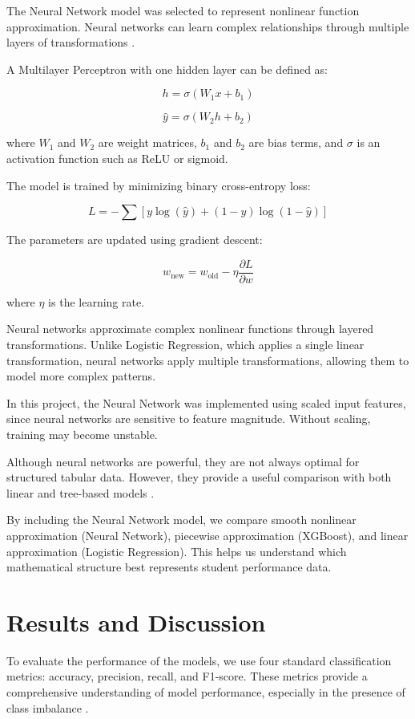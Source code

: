 \documentclass[conference]{IEEEtran}
\begin{document}
The Neural Network model was selected to represent nonlinear function approximation. Neural networks can learn complex relationships through multiple layers of transformations \cite{chong2025}.

A Multilayer Perceptron with one hidden layer can be defined as:

\[
h = \sigma(W_1 x + b_1)
\]

\[
\hat{y} = \sigma(W_2 h + b_2)
\]

where $W_1$ and $W_2$ are weight matrices, $b_1$ and $b_2$ are bias terms, and $\sigma$ is an activation function such as ReLU or sigmoid.

The model is trained by minimizing binary cross-entropy loss:

\[
L = - \sum \left[ y \log(\hat{y}) + (1 - y) \log(1 - \hat{y}) \right]
\]

The parameters are updated using gradient descent:

\[
w_{\text{new}} = w_{\text{old}} - \eta \frac{\partial L}{\partial w}
\]

where $\eta$ is the learning rate.

Neural networks approximate complex nonlinear functions through layered transformations. Unlike Logistic Regression, which applies a single linear transformation, neural networks apply multiple transformations, allowing them to model more complex patterns.

In this project, the Neural Network was implemented using scaled input features, since neural networks are sensitive to feature magnitude. Without scaling, training may become unstable.

Although neural networks are powerful, they are not always optimal for structured tabular data. However, they provide a useful comparison with both linear and tree-based models \cite{chong2025}.

By including the Neural Network model, we compare smooth nonlinear approximation (Neural Network), piecewise approximation (XGBoost), and linear approximation (Logistic Regression). This helps us understand which mathematical structure best represents student performance data.
\section{Results and Discussion}

To evaluate the performance of the models, we use four standard classification metrics: accuracy, precision, recall, and F1-score. These metrics provide a comprehensive understanding of model performance, especially in the presence of class imbalance \cite{nayak2023}.
\end{document}
